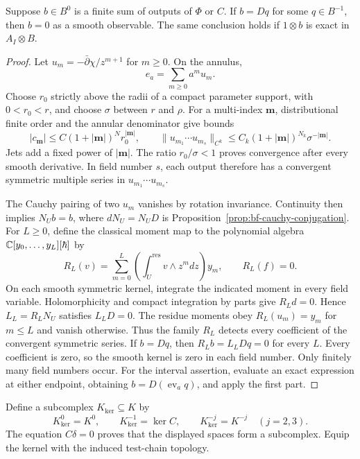 \begin{lemma}
\label{lem:cc-annular-detection}
Suppose $b\in B^0$ is a finite sum of outputs of $\Phi$ or $C$.
If $b=Dq$ for some $q\in B^{-1}$, then $b=0$ as a smooth observable.
The same conclusion holds if $1\otimes b$ is exact in $A_I\otimes B$.
\end{lemma}
\begin{proof}
Let $u_m=-\bar\partial\chi/z^{m+1}$ for $m\ge0$.
On the annulus,
\[
 e_a=\sum_{m\ge0}a^m u_m.
\]
Choose $r_0$ strictly above the radii of a compact parameter support,
with $0<r_0<r$, and choose $\sigma$ between $r$ and $\rho$.
For a multi-index $\mathbf m$, distributional finite order and the
annular denominator give bounds
\[
 |c_{\mathbf m}|\le C(1+|\mathbf m|)^N r_0^{|\mathbf m|},\qquad
 \|u_{m_1}\cdots u_{m_s}\|_{C^k}
       \le C_k(1+|\mathbf m|)^{N_k}\sigma^{-|\mathbf m|}.
\]
Jets add a fixed power of $|\mathbf m|$.
The ratio $r_0/\sigma<1$ proves convergence after every smooth derivative.
In field number $s$, each output therefore has a convergent symmetric
multiple series in $u_{m_1}\cdots u_{m_s}$.

The Cauchy pairing of two $u_m$ vanishes by rotation invariance.
Continuity then implies $N_Ub=b$, where $dN_U=N_UD$ is
Proposition~\ref{prop:bf-cauchy-conjugation}.
For $L\ge0$, define the classical moment map to the polynomial algebra
$\mathbb C[y_0,\ldots,y_L][\hbar]$ by
\[
 R_L(v)=\sum_{m=0}^L\left(\int_U^{\mathrm{res}}v\wedge z^m dz\right)y_m,
 \qquad R_L(f)=0.
\]
On each smooth symmetric kernel, integrate the indicated moment in every
field variable.  Holomorphicity and compact integration by parts give
$R_Ld=0$.  Hence $L_L=R_LN_U$ satisfies $L_LD=0$.
The residue moments obey $R_L(u_m)=y_m$ for $m\le L$ and vanish otherwise.
Thus the family $R_L$ detects every coefficient of the convergent symmetric
series.  If $b=Dq$, then $R_Lb=L_LDq=0$ for every $L$.
Every coefficient is zero, so the smooth kernel is zero in each field
number.  Only finitely many field numbers occur.
For the interval assertion, evaluate an exact expression at either
endpoint, obtaining $b=D(\operatorname{ev}_a q)$, and apply the first part.
\end{proof}

Define a subcomplex $K_{\mathrm{ker}}\subseteq K$ by
\[
 K_{\mathrm{ker}}^0=K^0,\qquad
 K_{\mathrm{ker}}^{-1}=\ker C,\qquad
 K_{\mathrm{ker}}^{-j}=K^{-j}\quad(j=2,3).
\]
The equation $C\delta=0$ proves that the displayed spaces form a
subcomplex.  Equip the kernel with the induced test-chain topology.

